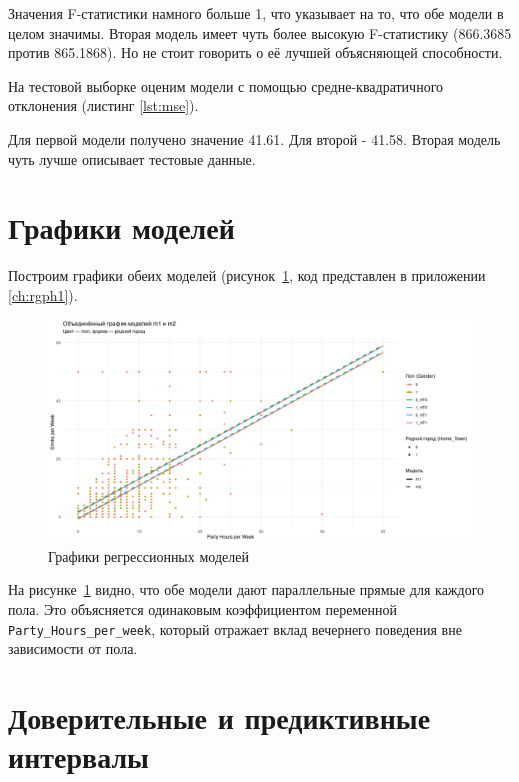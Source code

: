 Значения F-статистики намного больше 1, что указывает на то, что обе модели в целом значимы.
Вторая модель имеет  чуть более высокую F-статистику (866.3685 против 865.1868). Но не стоит говорить о её лучшей объясняющей способности.

На тестовой выборке оценим модели с помощью средне-квадратичного отклонения\cite{wapnick2009} (листинг \ref{lst:mse}).



Для первой модели получено значение 41.61. Для второй - 41.58. Вторая модель чуть лучше описывает тестовые данные.
\newpage
\section{Графики моделей}

Построим графики обеих моделей (рисунок~\ref{fig:models}, код представлен в приложении \ref{ch:rgph1}).


\begin{figure}[h]
	\centering
	\includegraphics[height=0.6\textwidth]{imgs/models.png}
	\caption{Графики регрессионных моделей}
	\label{fig:models}
\end{figure}

На рисунке~\ref{fig:models} видно, что обе модели дают параллельные прямые для каждого пола. Это объясняется одинаковым коэффициентом переменной \texttt{Party\_Hours\_per\_week}, который отражает вклад вечернего поведения вне зависимости от пола.




\section{Доверительные и предиктивные интервалы}
